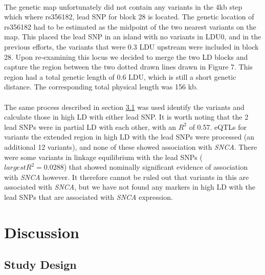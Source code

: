 \documentclass{article}
\begin{document}
\\The genetic map unfortunately did not contain any variants in the 4kb step which where rs356182, lead SNP for block 28 is located. The genetic location of rs356182 had to be estimated as the midpoint of the two nearest variants on the map. This placed the lead SNP in an island with no variants in LDU0, and in the previous efforts, the variants that were 0.3 LDU  upstream were included in block 28. Upon re-examining this locus we decided to merge the two LD blocks and capture the region between the two dotted drawn lines drawn in Figure 7. This region had a total genetic length of 0.6 LDU, which is still a short genetic distance. The corresponding total physical length was 156 kb.
\\
\\The same process described in section \hyperref[subsubsec:SNPs]{3.1} was used identify the variants and calculate those in high LD with either lead SNP. It is worth noting that the 2 lead SNPs were in partial LD with each other, with an $R^2$ of 0.57. eQTLs for variants the extended region in high LD with the lead SNPs were processed (an additional 12 variants), and none of these showed association with \textit{SNCA}. There were some variants in linkage equilibrium with the lead SNPs ($largest R^2 = 0.0288$) that showed nominally significant evidence of association with \textit{SNCA} however. It therefore cannot be ruled out that variants in this are associated with \textit{SNCA}, but we have not found any markers in high LD with the lead SNPs that are associated with \textit{SNCA} expression.
\newpage
\section{Discussion}
\subsection{Study Design}
\label{subsec:studydesign}
\end{document}
